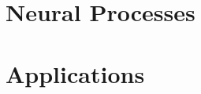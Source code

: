 \documentclass[12pt, oneside]{report}
\begin{document}
\chapter{Neural Processes}

\bigbreak
\begin{center}
\end{center}





\chapter{Applications}
%
\bigbreak
\begin{center}
\end{center}







\linespread{1.2}  
\printbibliography








% 
\end{document}

